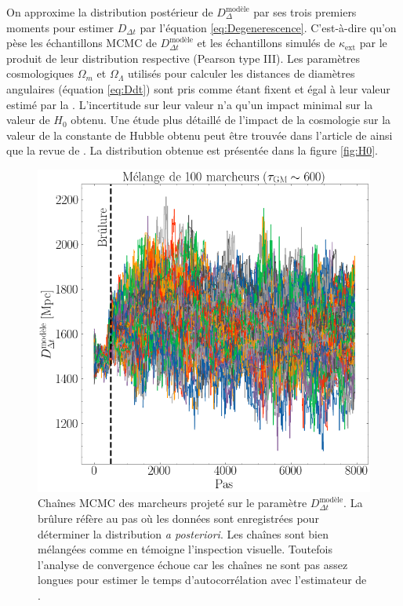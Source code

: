\documentclass[times,10pt,twocolumn]{article}
\begin{document}
On approxime la distribution postérieur de $D_{\Delta}^{\text{modèle}}$ par 
ses trois premiers moments pour estimer 
$D_{\Delta t}$ par l'équation \eqref{eq:Degenerescence}. C'est-à-dire qu'on pèse les 
échantillons MCMC de $D_{\Delta t}^{\text{modèle}}$ et les échantillons simulés 
de $\kappa_{\mathrm{ext}}$ par 
le produit de leur distribution respective (Pearson type III). Les 
paramètres cosmologiques $\Omega_m$ et $\Omega_\Lambda$ utilisés 
pour calculer les 
distances de diamètres angulaires (équation \eqref{eq:Ddt}) sont 
pris comme étant fixent et égal à leur valeur estimé par la \citet{PlanckCollaboration2018}. 
L'incertitude sur leur valeur n'a qu'un impact minimal sur la valeur de $H_0$ obtenu. 
Une étude plus détaillé de l'impact de la cosmologie sur la valeur de la constante de 
Hubble obtenu peut être trouvée dans l'article de \citet{Suyu2013} ainsi 
que la revue de \citet{Treu2010}. La distribution obtenue est présentée dans la figure 
\ref{fig:H0}.


\begin{figure}[H]
        \centering
        \includegraphics[width=\linewidth]{ddt_walkers_mixing}
        \caption{Chaînes MCMC des marcheurs projeté sur le paramètre 
        $D_{\Delta t}^{\text{modèle}}$. La brûlure réfère au pas où les données 
sont enregistrées pour déterminer la distribution \textit{a posteriori}. Les chaînes 
sont bien mélangées comme en témoigne l'inspection visuelle. Toutefois l'analyse de 
convergence échoue car les chaînes ne sont pas assez longues pour estimer le temps 
d'autocorrélation avec l'estimateur de \citet{Goodman2010}.}
        \label{fig:mixing}
\end{figure}
\end{document}
